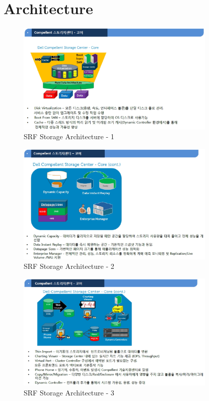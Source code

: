 \documentclass[11pt
  , a4paper
  , article
  , oneside
]{memoir}
\begin{document}
\section{Architecture}
\begin{figure}[h!]
	\centering
	\includegraphics[width=0.85\textwidth]{./images/srfdb_storage_arch_1.eps}
	\caption{SRF Storage Architecture - 1}
	\label{fig:srfdb_arch_1} 
\end{figure}

\begin{figure}[h!]
	\centering
	\includegraphics[width=0.85\textwidth]{./images/srfdb_storage_arch_2.eps}
	\caption{SRF Storage Architecture - 2}
	\label{fig:srfdb_arch_2} 
\end{figure}

\begin{figure}[h!]
	\centering
	\includegraphics[width=0.85\textwidth]{./images/srfdb_storage_arch_3.eps}
	\caption{SRF Storage Architecture - 3}
	\label{fig:srfdb_arch_3} 
\end{figure}
\end{document}
